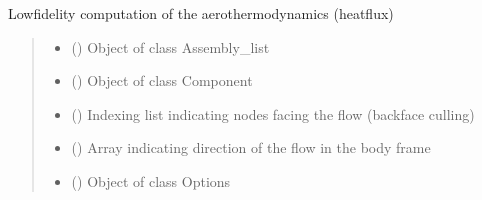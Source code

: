 \documentclass[letterpaper,10pt,english]{sphinxmanual}
\begin{document}

\begin{fulllineitems}
\label{\detokenize{modules:aerothermo.compute_aerothermodynamics}}
\pysigstartsignatures
{}
\pysigstopsignatures
\sphinxAtStartPar
Low\sphinxhyphen{}fidelity computation of the aerothermodynamics (heat\sphinxhyphen{}flux)
\begin{quote}\begin{description}
\begin{itemize}
\item {} 
\sphinxAtStartPar
{} ({\hyperref[\detokenize{modules:assembly.Assembly_list}]{}}) \textendash{} Object of class Assembly\_list

\item {} 
\sphinxAtStartPar
{} ({\hyperref[\detokenize{modules:component.Component}]{}}) \textendash{} Object of class Component

\item {} 
\sphinxAtStartPar
{} (\sphinxstyleliteralemphasis{\sphinxupquote{(}}\sphinxstyleliteralemphasis{\sphinxupquote{)}}) \textendash{} Indexing list indicating nodes facing the flow (backface culling)

\item {} 
\sphinxAtStartPar
{} (\sphinxstyleliteralemphasis{\sphinxupquote{(}}\sphinxstyleliteralemphasis{\sphinxupquote{)}}) \textendash{} Array indicating direction of the flow in the body frame

\item {} 
\sphinxAtStartPar
{} ({\hyperref[\detokenize{modules:configuration.Options}]{}}) \textendash{} Object of class Options

\end{itemize}

\end{description}\end{quote}

\end{fulllineitems}
\end{document}
